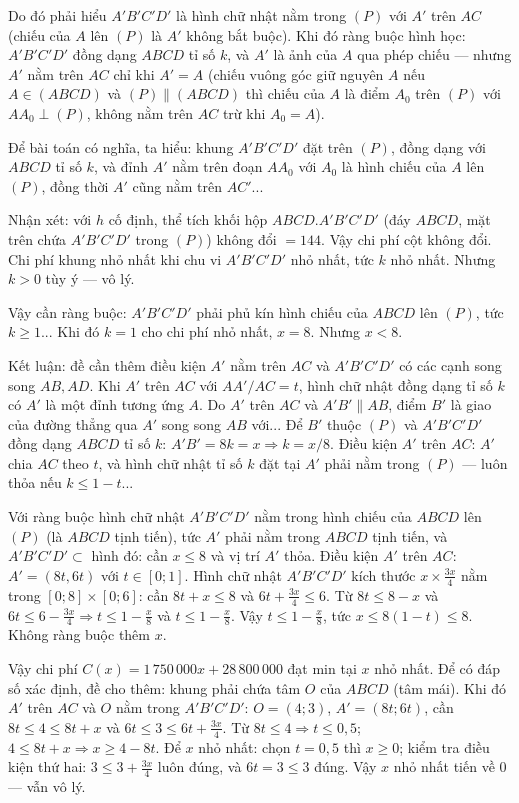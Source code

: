\begin{bt}
{Do đó phải hiểu $A'B'C'D'$ là hình chữ nhật nằm trong $(P)$ với $A'$ trên $AC$ (chiếu của $A$ lên $(P)$ là $A'$ không bắt buộc). Khi đó ràng buộc hình học: $A'B'C'D'$ đồng dạng $ABCD$ tỉ số $k$, và $A'$ là ảnh của $A$ qua phép chiếu — nhưng $A'$ nằm trên $AC$ chỉ khi $A'=A$ (chiếu vuông góc giữ nguyên $A$ nếu $A\in(ABCD)$ và $(P)\parallel(ABCD)$ thì chiếu của $A$ là điểm $A_0$ trên $(P)$ với $AA_0\perp(P)$, không nằm trên $AC$ trừ khi $A_0=A$).

Để bài toán có nghĩa, ta hiểu: khung $A'B'C'D'$ đặt trên $(P)$, đồng dạng với $ABCD$ tỉ số $k$, và đỉnh $A'$ nằm trên đoạn $AA_0$ với $A_0$ là hình chiếu của $A$ lên $(P)$, đồng thời $A'$ cũng nằm trên $AC'$... 

Nhận xét: với $h$ cố định, thể tích khối hộp $ABCD.A'B'C'D'$ (đáy $ABCD$, mặt trên chứa $A'B'C'D'$ trong $(P)$) không đổi $=144$. Vậy chi phí cột không đổi. Chi phí khung nhỏ nhất khi chu vi $A'B'C'D'$ nhỏ nhất, tức $k$ nhỏ nhất. Nhưng $k>0$ tùy ý — vô lý.

Vậy cần ràng buộc: $A'B'C'D'$ phải phủ kín hình chiếu của $ABCD$ lên $(P)$, tức $k\ge 1$... Khi đó $k=1$ cho chi phí nhỏ nhất, $x=8$. Nhưng $x<8$.

Kết luận: đề cần thêm điều kiện $A'$ nằm trên $AC$ và $A'B'C'D'$ có các cạnh song song $AB,AD$. Khi $A'$ trên $AC$ với $AA'/AC=t$, hình chữ nhật đồng dạng tỉ số $k$ có $A'$ là một đỉnh tương ứng $A$. Do $A'$ trên $AC$ và $A'B'\parallel AB$, điểm $B'$ là giao của đường thẳng qua $A'$ song song $AB$ với... Để $B'$ thuộc $(P)$ và $A'B'C'D'$ đồng dạng $ABCD$ tỉ số $k$: $A'B'=8k=x\Rightarrow k=x/8$. Điều kiện $A'$ trên $AC$: $A'$ chia $AC$ theo $t$, và hình chữ nhật tỉ số $k$ đặt tại $A'$ phải nằm trong $(P)$ — luôn thỏa nếu $k\le 1-t$... 

Với ràng buộc hình chữ nhật $A'B'C'D'$ nằm trong hình chiếu của $ABCD$ lên $(P)$ (là $ABCD$ tịnh tiến), tức $A'$ phải nằm trong $ABCD$ tịnh tiến, và $A'B'C'D'\subset$ hình đó: cần $x\le 8$ và vị trí $A'$ thỏa. Điều kiện $A'$ trên $AC$: $A'=(8t,6t)$ với $t\in[0;1]$. Hình chữ nhật $A'B'C'D'$ kích thước $x\times \frac{3x}{4}$ nằm trong $[0;8]\times[0;6]$: cần $8t+x\le 8$ và $6t+\frac{3x}{4}\le 6$. Từ $8t\le 8-x$ và $6t\le 6-\frac{3x}{4}\Rightarrow t\le 1-\frac{x}{8}$ và $t\le 1-\frac{x}{8}$. Vậy $t\le 1-\frac{x}{8}$, tức $x\le 8(1-t)\le 8$. Không ràng buộc thêm $x$.

Vậy chi phí $C(x)=1\,750\,000x+28\,800\,000$ đạt min tại $x$ nhỏ nhất. Để có đáp số xác định, đề cho thêm: khung phải chứa tâm $O$ của $ABCD$ (tâm mái). Khi đó $A'$ trên $AC$ và $O$ nằm trong $A'B'C'D'$: $O=(4;3)$, $A'=(8t;6t)$, cần $8t\le 4\le 8t+x$ và $6t\le 3\le 6t+\frac{3x}{4}$. Từ $8t\le 4\Rightarrow t\le 0{,}5$; $4\le 8t+x\Rightarrow x\ge 4-8t$. Để $x$ nhỏ nhất: chọn $t=0{,}5$ thì $x\ge 0$; kiểm tra điều kiện thứ hai: $3\le 3+\frac{3x}{4}$ luôn đúng, và $6t=3\le 3$ đúng. Vậy $x$ nhỏ nhất tiến về $0$ — vẫn vô lý.

}
\end{bt}
